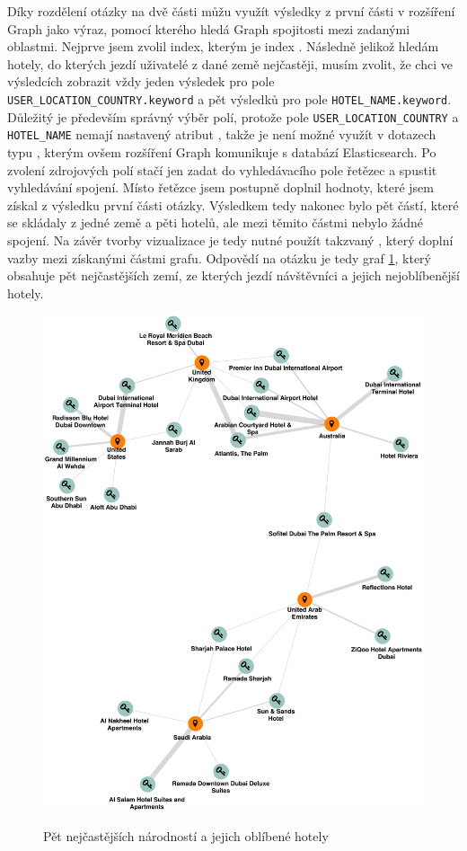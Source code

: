 \documentclass[czech,BP]{thesiskiv}
\begin{document}
Díky rozdělení otázky na dvě části můžu využít výsledky z první části v rozšíření Graph jako výraz, pomocí kterého hledá Graph spojitosti mezi zadanými oblastmi. Nejprve jsem zvolil index, kterým je index . Následně jelikož hledám hotely, do kterých jezdí uživatelé z dané země nejčastěji, musím zvolit, že chci ve výsledcích zobrazit vždy jeden výsledek pro pole\texttt{ USER\_LOCATION\_COUNTRY.keyword} a pět výsledků pro pole \texttt{HOTEL\_NAME.keyword}. Důležitý je především správný výběr polí, protože pole \texttt{USER\_LOCATION\_COUNTRY} a \texttt{HOTEL\_NAME} nemají nastavený atribut , takže je není možné využít v dotazech typu , kterým ovšem rozšíření Graph komunikuje s databází Elasticsearch. Po zvolení zdrojových polí stačí jen zadat do vyhledávacího pole řetězec  a spustit vyhledávání spojení. Místo řetězce  jsem postupně doplnil hodnoty, které jsem získal z výsledku první části otázky. Výsledkem tedy nakonec bylo pět částí, které se skládaly z jedné země a pěti hotelů, ale mezi těmito částmi nebylo žádné spojení. Na závěr tvorby vizualizace je tedy nutné použít takzvaný \textbf{}, který doplní vazby mezi získanými částmi grafu. Odpovědí na otázku je tedy graf \ref{fig:TopFive}, který obsahuje pět nejčastějších zemí, ze kterých jezdí návštěvníci a jejich nejoblíbenější hotely.

\begin{figure} [htbp]
	\centering
	\includegraphics[width= 12.5 cm]{img/5_countries_highest_appearance_graph2.eps}
	\label{fig:TopFive}
	\caption{Pět nejčastějších národností a jejich oblíbené hotely}
\end{figure}
\end{document}
